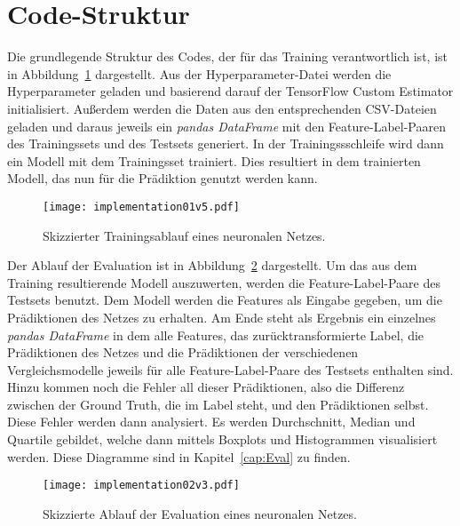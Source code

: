 
\section{Code-Struktur}

Die grundlegende Struktur des Codes, der für das Training verantwortlich ist, ist in Abbildung~\ref{fig:impl01} dargestellt.
Aus der Hyperparameter-Datei werden die Hyperparameter geladen und basierend darauf der TensorFlow Custom Estimator initialisiert.
Außerdem werden die Daten aus den entsprechenden CSV-Dateien geladen 
und daraus jeweils ein \textit{pandas DataFrame} mit den Feature-Label-Paaren des Trainingssets und des Testsets generiert.
In der Trainingssschleife wird dann ein Modell mit dem Trainingsset trainiert.
Dies resultiert in dem trainierten Modell, das nun für die Prädiktion genutzt werden kann.

\begin{figure}[p]
    \centering
    \texttt{[image: implementation01v5.pdf]}
    \caption{Skizzierter Trainingsablauf eines neuronalen Netzes.}
    \label{fig:impl01}
\end{figure}


Der Ablauf der Evaluation ist in Abbildung~\ref{fig:impl02} dargestellt. 
Um das aus dem Training resultierende Modell auszuwerten, werden die Feature-Label-Paare des Testsets benutzt.
Dem Modell werden die Features als Eingabe gegeben, um die Prädiktionen des Netzes zu erhalten.
Am Ende steht als Ergebnis ein einzelnes \textit{pandas DataFrame} in dem alle Features, das zurücktransformierte Label, 
die Prädiktionen des Netzes und die Prädiktionen der verschiedenen Vergleichsmodelle jeweils für alle Feature-Label-Paare des Testsets enthalten sind.
Hinzu kommen noch die Fehler all dieser Prädiktionen, also die Differenz zwischen der Ground Truth, die im Label steht, und den Prädiktionen selbst.
Diese Fehler werden dann analysiert.
Es werden Durchschnitt, Median und Quartile gebildet, welche dann mittels Boxplots und Histogrammen visualisiert werden.
Diese Diagramme sind in Kapitel~\ref{cap:Eval} zu finden.



\begin{figure}[p]
    \centering
    \texttt{[image: implementation02v3.pdf]}
    \caption{Skizzierte Ablauf der Evaluation eines neuronalen Netzes.}
    \label{fig:impl02}
\end{figure}


